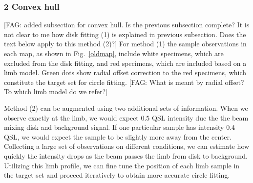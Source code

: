 \documentclass{aa}
\newcommand{\fag}[1]{\textcolor{midpurple}{[FAG: #1]}} %
\begin{document}
  \subsubsection{2 Convex hull}
  \fag{added subsection for convex hull. Is the previous subsection complete?
  It is not clear to me how disk fitting (1) is explained in previous
  subsection.
  Does the text below apply to this method (2)?}
  For method (1) the sample observations in each map, as shown in
  Fig.~\ref{oldmap}, include white specimens, which are excluded from the disk
  fitting, and red specimens, which are included based on a limb model.
  Green dots show radial offset correction to the red specimens, which constitute
  the target set for circle fitting.
  \fag{What is meant by radial offset? To which limb model do we refer?}


  Method (2) can be augmented using two additional sets of information.
  When we observe exactly at the limb, we would expect $0.5$ QSL intensity
  due the the beam mixing disk and background signal.
  If one particular sample has intensity $0.4$ QSL, we would expect the
  sample to be slightly more away from the center.
  Collecting a large set of observations on different conditions, we can
  estimate how quickly the intensity drops as the beam passes the limb 
  from disk to background.
  Utilizing this limb profile, we can fine tune the position of each limb
  sample in the target set and proceed iteratively to obtain more
  accurate circle fitting.
  
\end{document}
